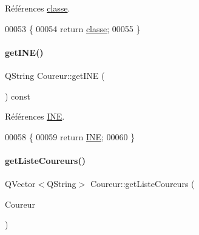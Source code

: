 Références \hyperlink{class_coureur_a274255068bb91a5c66a365cd10528280}{classe}.


\begin{DoxyCode}
00053 \{
00054     \textcolor{keywordflow}{return} \hyperlink{class_coureur_a274255068bb91a5c66a365cd10528280}{classe};
00055 \}
\end{DoxyCode}
\mbox{\label{class_coureur_a724d13c5c34757fcd70491da44a918e3}} 
\paragraph{\texorpdfstring{get\+I\+N\+E()}{getINE()}}
{\footnotesize\ttfamily Q\+String Coureur\+::get\+I\+NE (\begin{DoxyParamCaption}{ }\end{DoxyParamCaption}) const}



Références \hyperlink{class_coureur_ac4028301fbd425848c2a81d69f8f94ac}{I\+NE}.


\begin{DoxyCode}
00058 \{
00059     \textcolor{keywordflow}{return} \hyperlink{class_coureur_ac4028301fbd425848c2a81d69f8f94ac}{INE};
00060 \}
\end{DoxyCode}
\mbox{\label{class_coureur_a1d9f2cb15f74ff1c7b20fde081b5c5d6}} 
\paragraph{\texorpdfstring{get\+Liste\+Coureurs()}{getListeCoureurs()}\hspace{0.1cm}{\footnotesize\ttfamily [1/2]}}
{\footnotesize\ttfamily Q\+Vector$<$Q\+String$>$ Coureur\+::get\+Liste\+Coureurs (\begin{DoxyParamCaption}\item[{Q\+String}]{Coureur }\end{DoxyParamCaption})}

\mbox{\label{class_coureur_a99e640aba229bb629e894729413b4e84}} 
